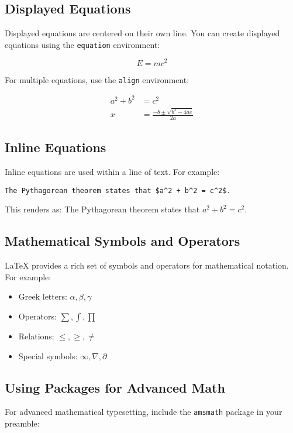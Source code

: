 \documentclass{article}
\begin{document}
\subsection{Displayed Equations}
Displayed equations are centered on their own line. You can create displayed equations using the \texttt{equation} environment:

\begin{equation}
E = mc^2
\end{equation}

For multiple equations, use the \texttt{align} environment:

\begin{align}
a^2 + b^2 &= c^2 \\
x &= \frac{-b \pm \sqrt{b^2 - 4ac}}{2a}
\end{align}

\subsection{Inline Equations}
Inline equations are used within a line of text. For example:

\begin{verbatim}
The Pythagorean theorem states that $a^2 + b^2 = c^2$.
\end{verbatim}

This renders as: The Pythagorean theorem states that \(a^2 + b^2 = c^2\).

\subsection{Mathematical Symbols and Operators}
LaTeX{} provides a rich set of symbols and operators for mathematical notation. For example:
\begin{itemize}
    \item Greek letters: \(\alpha, \beta, \gamma\)
    \item Operators: \(\sum, \int, \prod\)
    \item Relations: \(\leq, \geq, \neq\)
    \item Special symbols: \(\infty, \nabla, \partial\)
\end{itemize}

\subsection{Using Packages for Advanced Math}
For advanced mathematical typesetting, include the \texttt{amsmath} package in your preamble:
\end{document}
